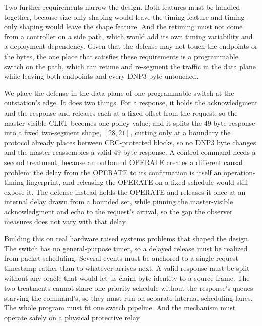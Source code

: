 Two further requirements narrow the design. Both features must be handled together, because size-only
shaping would leave the timing feature and timing-only shaping would leave the shape feature. And the
retiming must not come from a controller on a side path, which would add its own timing variability and
a deployment dependency. Given that the defense may not touch the endpoints or the bytes, the one place
that satisfies these requirements is a programmable switch on the path, which can retime and re-segment
the traffic in the data plane while leaving both endpoints and every DNP3 byte untouched.

We place the defense in the data plane of one programmable switch at the outstation's edge. It does
two things. For a response, it holds the acknowledgment and the response and releases each at a fixed
offset from the request, so the master-visible CLRT becomes one policy value; and it splits the
49-byte response into a fixed two-segment shape, $[28,21]$, cutting only at a boundary the protocol
already places between CRC-protected blocks, so no DNP3 byte changes and the master reassembles a
valid 49-byte response. A control command needs a second treatment, because an outbound OPERATE
creates a different causal problem: the delay from the OPERATE to its confirmation is itself an
operation-timing fingerprint, and releasing the OPERATE on a fixed schedule would still expose
it. The defense instead holds the OPERATE and releases it once at an internal delay drawn from a
bounded set, while pinning the master-visible acknowledgment and echo to the request's arrival, so the
gap the observer measures does not vary with that delay.

Building this on real hardware raised systems problems that shaped the design. The switch has no
general-purpose timer, so a delayed release must be realized from packet scheduling. Several events
must be anchored to a single request timestamp rather than to whatever arrives next. A valid response
must be split without any oracle that would let us claim byte identity to a source frame. The two
treatments cannot share one priority schedule without the response's queues starving the command's,
so they must run on separate internal scheduling lanes. The whole program must fit one switch
pipeline. And the mechanism must operate safely on a physical protective relay.

